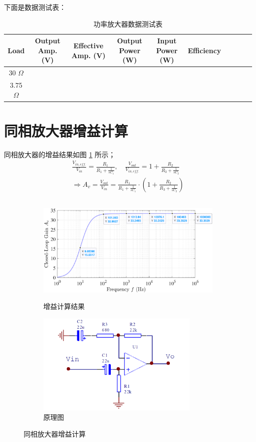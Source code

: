 \documentclass[UTF8]{article}
\begin{document}
\noindent 下面是数据测试表：

\begin{table}[H]\centering
    \caption{功率放大器数据测试表}
    \label{功率放大器数据测试表}
\begin{tabular}{cccccccccc}\toprule
    Load & Output Amp. (V) & Effective Amp. (V) & Output Power (W) & Input Power (W) & Efficiency  \\
    \midrule
    30 $\Omega$ &  &   \\
    3.75 $\Omega$ &  &   \\
    \bottomrule
\end{tabular}
\end{table}

\section{同相放大器增益计算}

同相放大器的增益结果如图 \ref{fig: 同相放大器增益计算} 所示；
\begin{gather}
\frac{V_{in,eff.}}{V_{in}} = \frac{R_1}{R_1 + \frac{1}{sC_1}},\quad 
\frac{V_{out}}{V_{in,eff.}} = 1 + \frac{R_2}{R_3 + \frac{1}{sC_2}}
\\ 
\Longrightarrow 
A_v = \frac{V_{out}}{V_{in}} = \frac{R_1}{R_1 + \frac{1}{sC_1}} \cdot \left(1 + \frac{R_2}{R_3 + \frac{1}{sC_2}}\right)
\end{gather}

\begin{figure}[H]\centering
    \begin{subfigure}[b]{0.63\columnwidth}\centering
        \includegraphics[height=150pt]{preview/assets/2025-04-15_16-10-10.pdf}
        \caption{增益计算结果}
    \end{subfigure}
\begin{subfigure}[b]{0.35\columnwidth}\centering
    \includegraphics[height=140pt]{preview/assets/amp.png}
    \caption{原理图}
\end{subfigure}
\caption{同相放大器增益计算}
\label{fig: 同相放大器增益计算}
\end{figure}
\end{document}
